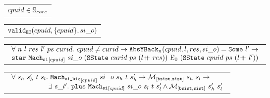 \begin{hypothesis}
\begin{tabular}{P{0.95\textwidth}}
$cpuid \in \coreset$
\end{tabular}
\end{hypothesis}

\begin{hypothesis}
\begin{tabular}{P{0.95\textwidth}}
$\validoraclenoeq{cpuid}{\set{cpuid}}{si\_o }$
\end{tabular}
\end{hypothesis}


\begin{lemma}
\begin{tabular}{P{0.95\textwidth}}
$
\begin{array}{l}
\forall \ n \ l \ res \ l' \ ps \ curid . \ cpuid \neq curid \rightarrow \yieldbackfunc{n}{cpuid}{l}{res}{si\_o}{l'} \rightarrow\\
\ccstarstep{\singlestep{cpuid}{si\_o}{(\singlestate{curid}{ps}{(\listappoppo{res}{l})})}{\ccemptytrace}{(\singlestate{cpuid}{ps}{(\listappoppo{l'}{l})})}}\\ 
\end{array}
$
\end{tabular}
\end{lemma}

\begin{lemma}
\begin{tabular}{P{0.95\textwidth}}
$
\begin{array}{l}
\forall \ s_h \ s_h' \ t \ s_l . \ \singlebigstep{cpuid}{si\_o}{s_h}{t}{s_h'} \rightarrow  \matchbsstatesstate{s_h}{s_l} \rightarrow \\
\ \ \ \ \ \ \ \ \ \ \ \ \ \ \ \ \exists\ s\_l' . \  \ccplusstep{\singlestep{cpuid}{si\_o}{s_l}{t}{s_l'}} \wedge  \matchbsstatesstate{s_h'}{s_l'}\\
\end{array}
$
\end{tabular}
\end{lemma}


